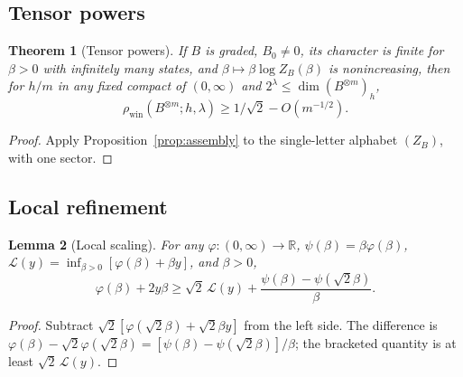 \documentclass[10pt,a4paper]{article}
\numberwithin{equation}{section}
\newtheorem{theorem}{Theorem}[section]
\newtheorem{lemma}[theorem]{Lemma}\newtheorem{proposition}[theorem]{Proposition}
\theoremstyle{remark}\newtheorem{remark}[theorem]{Remark}\newtheorem{question}[theorem]{Question}
\newcommand{\rhow}{\rho_{\mathrm{win}}}\newcommand{\F}{\mathbb F}\newcommand{\K}{\mathbb K}\newcommand{\Z}{\mathbb Z}\newcommand{\R}{\mathbb R}\newcommand{\cB}{\mathcal L}\newcommand{\wt}{\mathrm{wt}}\newcommand{\dimn}{\operatorname{dim}}\newcommand{\supp}{\operatorname{supp}}
\begin{document}
\subsection{Tensor powers}
\begin{theorem}[Tensor powers]\label{thm:tensor}
If $B$ is graded, $B_0\ne0$, its character is finite for $\beta>0$ with infinitely many states, and $\beta\mapsto\beta\log Z_B(\beta)$ is nonincreasing, then for $h/m$ in any fixed compact of $(0,\infty)$ and $2^\lambda\le\dimn(B^{\otimes m})_h$,
\[\rhow(B^{\otimes m};h,\lambda)\ge1/\sqrt2-O(m^{-1/2}).\]
\end{theorem}
\begin{proof}Apply Proposition~\ref{prop:assembly} to the single-letter alphabet $(Z_B)$, with one sector.\end{proof}

\subsection{Local refinement}
\begin{lemma}[Local scaling]\label{lem:local-scale}
For any $\varphi:(0,\infty)\to\R$, $\psi(\beta)=\beta\varphi(\beta)$, $\cB(y)=\inf_{\beta>0}[\varphi(\beta)+\beta y]$, and $\beta>0$,
\begin{equation}\label{eq:localscale}
\varphi(\beta)+2y\beta\ge\sqrt2\,\cB(y)+\frac{\psi(\beta)-\psi(\sqrt2\beta)}\beta.
\end{equation}
\end{lemma}
\begin{proof}
Subtract $\sqrt2[\varphi(\sqrt2\beta)+\sqrt2\beta y]$ from the left side. The difference is $\varphi(\beta)-\sqrt2\varphi(\sqrt2\beta)=[\psi(\beta)-\psi(\sqrt2\beta)]/\beta$; the bracketed quantity is at least $\sqrt2\,\cB(y)$.
\end{proof}
\end{document}
